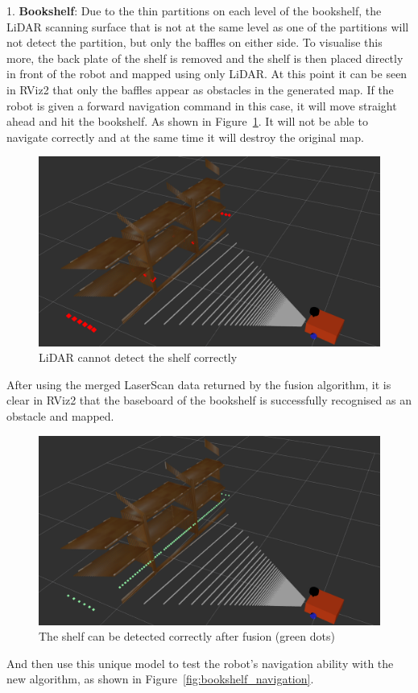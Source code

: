 1. \textbf{Bookshelf}: Due to the thin partitions on each level of the bookshelf, 
the LiDAR scanning surface that is not at the same level as one of the partitions will not detect the partition, 
but only the baffles on either side. To visualise this more, the back plate of the shelf is removed 
and the shelf is then placed directly in front of the robot and mapped using only LiDAR. 
At this point it can be seen in RViz2 that only the baffles appear as obstacles in the generated map. 
If the robot is given a forward navigation command in this case, it will move straight ahead and hit the bookshelf. 
As shown in Figure~\ref{fig:bookshelf}. It will not be able to navigate correctly and at the same time it will destroy the original map.
\begin{figure}[H]
    \centering
    \includegraphics[width=0.61\linewidth]{figs/cannot_shelf.png}
    \caption{LiDAR cannot detect the shelf correctly}
    \label{fig:bookshelf}
\end{figure}
After using the merged LaserScan data returned by the fusion algorithm, 
it is clear in RViz2 that the baseboard of the bookshelf is successfully recognised as an obstacle and mapped.
\begin{figure}[H]
    \centering
    \includegraphics[width=0.7\linewidth]{figs/can_shelf.png}
    \caption{The shelf can be detected correctly after fusion (green dots)}
\end{figure}
And then use this unique model to test the robot's navigation ability with the new algorithm, as shown in Figure~\ref{fig:bookshelf_navigation}.

